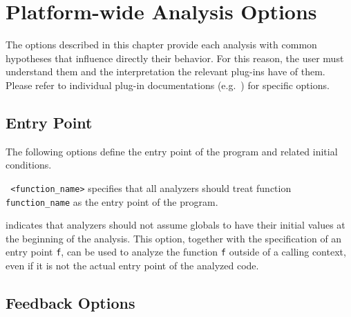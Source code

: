 \chapter{Platform-wide Analysis Options}
\label{user-analysis}

The options described in this chapter provide each analysis with common
hypotheses that influence directly their behavior.  For this reason, the user
must understand them and the interpretation the relevant plug-ins have of them.
Please refer to individual plug-in documentations
(e.g.~\cite{value,slicing,wp}) for specific options.


\section{Entry Point}

The following options define the entry point of the program and related initial
conditions.
\begin{description}
\item \texttt{ <function\_name>} specifies that all
  analyzers should treat function \texttt{function\_name} as the entry
  point of the program.
\item {} indicates that analyzers should not assume
  globals to have their initial values at the beginning of the analysis. This
  option, together with the specification of an entry point \texttt{f}, can be
  used to analyze the function \texttt{f} outside of a calling context, even if
  it is not the actual entry point of the analyzed code.
\end{description}

\section{Feedback Options}\label{sec:feedback-options}


